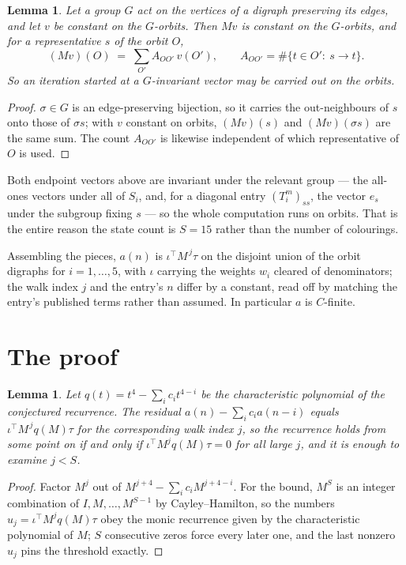 \documentclass[11pt,a4paper]{article}
\theoremstyle{plain}
\newtheorem{lemma}[theorem]{Lemma}
\theoremstyle{definition}
\begin{document}
\begin{lemma}\label{lem:lump}
Let a group $G$ act on the vertices of a digraph preserving its edges, and let $v$ be constant
on the $G$-orbits. Then $Mv$ is constant on the $G$-orbits, and for a representative $s$ of
the orbit $O$,
\[
(Mv)(O)\;=\;\sum_{O'}A_{OO'}\,v(O'),\qquad
A_{OO'}=\#\{t\in O':\ s\to t\} .
\]
So an iteration started at a $G$-invariant vector may be carried out on the orbits.
\end{lemma}

\begin{proof}
$\sigma\in G$ is an edge-preserving bijection, so it carries the out-neighbours of $s$ onto
those of $\sigma s$; with $v$ constant on orbits, $(Mv)(s)$ and $(Mv)(\sigma s)$ are the same
sum. The count $A_{OO'}$ is likewise independent of which representative of $O$ is used.
\end{proof}

Both endpoint vectors above are invariant under the relevant group --- the all-ones vectors
under all of $S_i$, and, for a diagonal entry $(T_i^m)_{ss}$, the vector $e_s$ under the
subgroup fixing $s$ --- so the whole computation runs on orbits. That is the entire reason the
state count is $S=15$ rather than the number of colourings.

Assembling the pieces, $a(n)$ is $\iota^{\!\top}M^{\,j}\tau$ on the disjoint union of the
orbit digraphs for $i=1,\dots,5$, with $\iota$ carrying the weights $w_i$ cleared of
denominators; the walk index $j$ and the entry's $n$ differ by a constant, read off by
matching the entry's published terms rather than assumed. In particular $a$ is $C$-finite.

\section{The proof}

\begin{lemma}\label{lem:crit}
Let $q(t)=t^{4}-\sum_i c_it^{4-i}$ be the characteristic polynomial of the
conjectured recurrence. The residual $a(n)-\sum_ic_ia(n-i)$ equals
$\iota^{\!\top}M^{\,j}q(M)\tau$ for the corresponding walk index $j$, so the recurrence
holds from some point on if and only if $\iota^{\!\top}M^{j}q(M)\tau=0$ for all large $j$,
and it is enough to examine $j<S$.
\end{lemma}

\begin{proof}
Factor $M^{j}$ out of $M^{j+4}-\sum_ic_iM^{j+4-i}$. For the bound, $M^{S}$
is an integer combination of $I,M,\dots,M^{S-1}$ by Cayley--Hamilton, so the numbers
$u_j=\iota^{\!\top}M^{j}q(M)\tau$ obey the monic recurrence given by the characteristic
polynomial of $M$; $S$ consecutive zeros force every later one, and the last nonzero $u_j$
pins the threshold exactly.
\end{proof}
\end{document}
